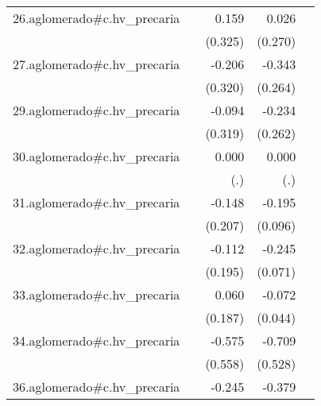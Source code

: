 {\begin{longtable}{l*{4}{D{.}{.}{-1}}}
\addlinespace
26.aglomerado#c.hv\_precaria&                     &       0.159         &       0.026         &                     \\
            &                     &     (0.325)         &     (0.270)         &                     \\
\addlinespace
27.aglomerado#c.hv\_precaria&                     &      -0.206         &      -0.343         &                     \\
            &                     &     (0.320)         &     (0.264)         &                     \\
\addlinespace
29.aglomerado#c.hv\_precaria&                     &      -0.094         &      -0.234         &                     \\
            &                     &     (0.319)         &     (0.262)         &                     \\
\addlinespace
30.aglomerado#c.hv\_precaria&                     &       0.000         &       0.000         &                     \\
            &                     &         (.)         &         (.)         &                     \\
\addlinespace
31.aglomerado#c.hv\_precaria&                     &      -0.148         &      -0.195\sym{*}  &                     \\
            &                     &     (0.207)         &     (0.096)         &                     \\
\addlinespace
32.aglomerado#c.hv\_precaria&                     &      -0.112         &      -0.245\sym{***}&                     \\
            &                     &     (0.195)         &     (0.071)         &                     \\
\addlinespace
33.aglomerado#c.hv\_precaria&                     &       0.060         &      -0.072         &                     \\
            &                     &     (0.187)         &     (0.044)         &                     \\
\addlinespace
34.aglomerado#c.hv\_precaria&                     &      -0.575         &      -0.709         &                     \\
            &                     &     (0.558)         &     (0.528)         &                     \\
\addlinespace
36.aglomerado#c.hv\_precaria&                     &      -0.245         &      -0.379\sym{*}  &                     \\

\end{longtable}}
